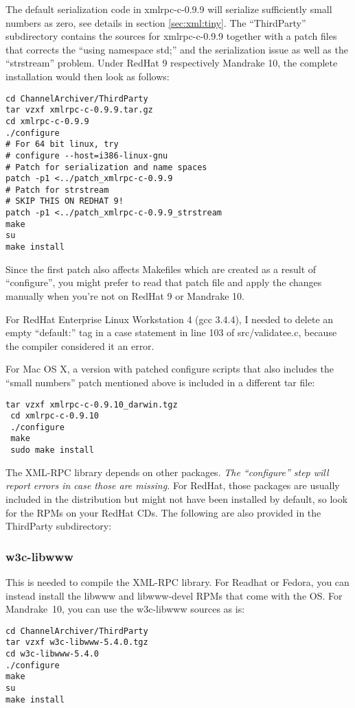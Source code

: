 \NOTE The default serialization code in xmlrpc-c-0.9.9 will serialize
sufficiently small numbers as zero, see details in section \ref{sec:xml:tiny}.
The ``ThirdParty'' subdirectory contains the sources for xmlrpc-c-0.9.9
together with a patch files that corrects the ``using namespace std;'' and
the serialization issue as well as the ``strstream'' problem.
Under RedHat 9 respectively Mandrake 10, the complete installation would
then look as follows:

\begin{lstlisting}[keywordstyle=\sffamily]
cd ChannelArchiver/ThirdParty
tar vzxf xmlrpc-c-0.9.9.tar.gz
cd xmlrpc-c-0.9.9
./configure
# For 64 bit linux, try
# configure --host=i386-linux-gnu
# Patch for serialization and name spaces
patch -p1 <../patch_xmlrpc-c-0.9.9
# Patch for strstream
# SKIP THIS ON REDHAT 9!
patch -p1 <../patch_xmlrpc-c-0.9.9_strstream
make
su
make install
\end{lstlisting}

\noindent Since the first patch also affects Makefiles which are
created as a result of ``configure'', you might prefer to read that
patch file and apply the changes manually when you're not on RedHat 9
or Mandrake 10.

For RedHat Enterprise Linux Workstation 4 (gcc 3.4.4),
I needed to delete an empty ``default:'' tag in a case statement
in line 103 of src/validatee.c, because the compiler considered
it an error.

For Mac OS X, a version with patched configure scripts
\cite{darwinports} that also includes the ``small numbers'' patch
mentioned above is included in a different tar file:
\begin{lstlisting}[keywordstyle=\sffamily]
 tar vzxf xmlrpc-c-0.9.10_darwin.tgz
 cd xmlrpc-c-0.9.10
 ./configure 
 make
 sudo make install
\end{lstlisting}


The XML-RPC library depends on other packages. \emph{The ``configure''
step will report errors in case those are missing.} For RedHat, those
packages are usually included in the distribution but might not have
been installed by default, so look for the RPMs on your RedHat CDs.
The following are also provided in the ThirdParty subdirectory:

\subsubsection{w3c-libwww}
This is needed to compile the XML-RPC library.
For Readhat or Fedora, you can instead install the libwww
and libwww-devel RPMs that come with the OS.
For Mandrake~10, you can use the w3c-libwww sources as is:
\begin{lstlisting}[keywordstyle=\sffamily]
cd ChannelArchiver/ThirdParty
tar vzxf w3c-libwww-5.4.0.tgz
cd w3c-libwww-5.4.0
./configure
make
su
make install
\end{lstlisting}

